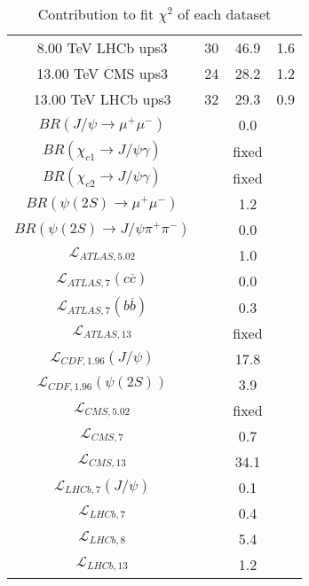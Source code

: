 \begin{table}[h!]
\begin{tabular}{c|c|c|c}
8.00 TeV LHCb ups3 & 30 & 46.9 & 1.6 \\
13.00 TeV CMS ups3 & 24 & 28.2 & 1.2 \\
13.00 TeV LHCb ups3 & 32 & 29.3 & 0.9 \\
\hline
$BR(J/\psi\rightarrow\mu^+\mu^-)$ &  & 0.0 &  \\
$BR(\chi_{c1}\rightarrow J/\psi\gamma)$ &  & fixed & \\
$BR(\chi_{c2}\rightarrow J/\psi\gamma)$ &  & fixed & \\
$BR(\psi(2S)\rightarrow\mu^+\mu^-)$ &  & 1.2 &  \\
$BR(\psi(2S)\rightarrow J/\psi\pi^+\pi^-)$ &  & 0.0 &  \\
$\mathcal L_{ATLAS,5.02}$ &  & 1.0 &  \\
$\mathcal L_{ATLAS,7}(c\overline c)$ &  & 0.0 &  \\
$\mathcal L_{ATLAS,7}(b\overline b)$ &  & 0.3 &  \\
$\mathcal L_{ATLAS,13}$ &  & fixed & \\
$\mathcal L_{CDF,1.96}(J/\psi)$ &  & 17.8 &  \\
$\mathcal L_{CDF,1.96}(\psi(2S))$ &  & 3.9 &  \\
$\mathcal L_{CMS,5.02}$ &  & fixed & \\
$\mathcal L_{CMS,7}$ &  & 0.7 &  \\
$\mathcal L_{CMS,13}$ &  & 34.1 &  \\
$\mathcal L_{LHCb,7}(J/\psi)$ &  & 0.1 &  \\
$\mathcal L_{LHCb,7}$ &  & 0.4 &  \\
$\mathcal L_{LHCb,8}$ &  & 5.4 &  \\
$\mathcal L_{LHCb,13}$ &  & 1.2 &  \\
\end{tabular}
\caption{Contribution to fit $\chi^2$ of each dataset}
\end{table}
